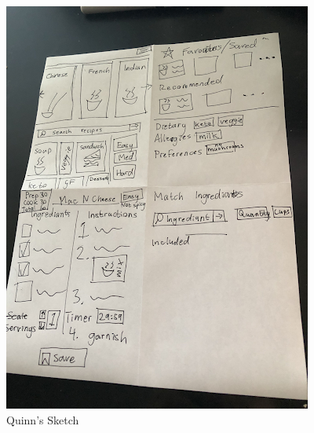 \documentclass[11pt,english]{article}
\begin{document}
\begin{figure}
\centering
  \includegraphics[width=\linewidth]{figure4.png}
  \caption{Quinn's Sketch}
  \label{fig:figure4}
\end{figure}
\end{document}
